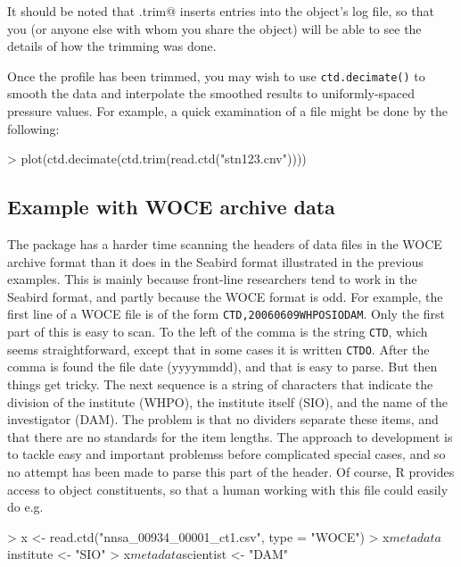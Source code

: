 \documentclass{article}
\begin{document}
It should be noted that \verb@ctd.trim@ inserts entries into the object's log
file, so that you (or anyone else with whom you share the object) will be able to
see the details of how the trimming was done.


Once the profile has been trimmed, you may wish to use \texttt{ctd.decimate()}
to smooth the data and interpolate the smoothed results to uniformly-spaced
pressure values. For example, a quick examination of a file might be done by the
following:
\begin{Schunk}
\begin{Sinput}
> plot(ctd.decimate(ctd.trim(read.ctd("stn123.cnv"))))
\end{Sinput}
\end{Schunk}

\subsection{Example with WOCE archive data}

The package has a harder time scanning the headers of data files in the WOCE
archive format than it does in the Seabird format illustrated in the previous
examples. This is mainly because front-line researchers tend to work in the
Seabird format, and partly because the WOCE format is odd. For example, the
first line of a WOCE file is of the form \texttt{CTD,20060609WHPOSIODAM}.  Only
the first part of this is easy to scan. To the left of the comma is the string
\texttt{CTD}, which seems straightforward, except that in some cases it is
written \texttt{CTDO}. After the comma is found the file date (yyyymmdd), and
that is easy to parse. But then things get tricky.  The next sequence is a
string of characters that indicate the division of the institute (WHPO), the
institute itself (SIO), and the name of the investigator (DAM). The problem is
that no dividers separate these items, and that there are no standards for the
item lengths. The approach to \verb@oce@ development is to tackle easy and
important problemss before complicated special cases, and so no attempt has been
made to parse this part of the header. Of course, R provides access to object
constituents, so that a human working with this file could easily do e.g.
\begin{Schunk}
\begin{Sinput}
> x <- read.ctd("nnsa_00934_00001_ct1.csv", type = "WOCE")
> x$metadata$institute <- "SIO"
> x$metadata$scientist <- "DAM"
\end{Sinput}
\end{Schunk}
\end{document}

